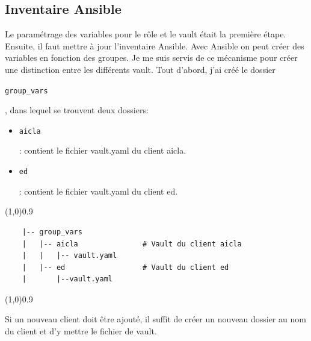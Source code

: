 \documentclass[12pt, a4paper, twoside]{article}
\begin{document}
\subsection{Inventaire Ansible}
Le paramétrage des variables pour le rôle et le vault était la première étape. 
Ensuite, il faut mettre à jour l'inventaire \gls{Ansible}.
Avec \gls{Ansible} on peut créer des variables en fonction des groupes.
Je me suis servis de ce mécanisme pour créer une distinction entre les différents vault.
Tout d'abord, j'ai créé le dossier \begin{code}\texttt{group\_vars}\end{code}, dans lequel se trouvent deux dossiers:
\begin{itemize}
    \item  \begin{code}\texttt{aicla}\end{code}: contient le fichier vault.yaml du client aicla.
    \item  \begin{code}\texttt{ed}\end{code}: contient le fichier vault.yaml du client ed.
\end{itemize}

\vspace{-1ex}
\begin{code}
\vspace{-1ex}
\begin{center} 
    \line(1,0){0.9\textwidth} 
\end{center}
\vspace{-1ex}
\begin{verbatim}
    |-- group_vars
    |   |-- aicla               # Vault du client aicla
    |   |   |-- vault.yaml
    |   |-- ed                  # Vault du client ed
    |       |--vault.yaml
\end{verbatim}
\vspace{-1ex}
\begin{center} 
    \line(1,0){0.9\textwidth} 
\end{center}
\vspace{-1ex}
\end{code}

Si un nouveau client doit être ajouté, il suffit de créer un nouveau dossier au nom du client et d'y mettre le fichier de vault.
\end{document}
